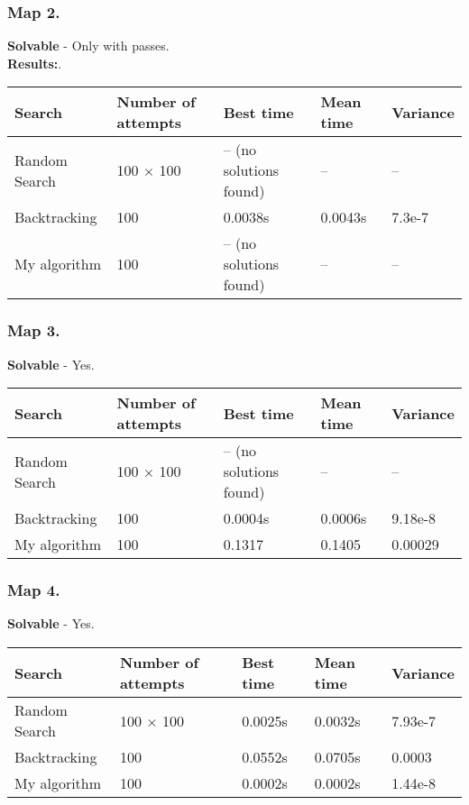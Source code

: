 \documentclass[a4paper,12pt]{article}
\begin{document}
    \subsubsection*{Map 2.}
    
    \textbf{Solvable} - Only with passes.\\
    \textbf{Results:}.

    \begin{center}
        \begin{tabular}{|l|l|l|l|l|}
            \hline
            Search & Number of attempts & Best time & Mean time & Variance\\
            \hline
            Random Search & 100 $\times$ 100 & -- (no solutions found) & -- & --\\
            \hline
            Backtracking & 100 & 0.0038s & 0.0043s & 7.3e-7\\
            \hline
            My algorithm & 100 & -- (no solutions found) & -- &  --\\
            \hline
        \end{tabular}
    \end{center}
    \newpage
    \subsubsection*{Map 3.}
    
    \textbf{Solvable} - Yes.\\
    \begin{center}
        \begin{tabular}{|l|l|l|l|l|}
            \hline
            Search & Number of attempts & Best time & Mean time & Variance\\
            \hline
            Random Search & 100 $\times$ 100 & -- (no solutions found) & -- & --\\
            \hline
            Backtracking & 100 & 0.0004s & 0.0006s & 9.18e-8\\
            \hline
            My algorithm & 100 & 0.1317 & 0.1405 &  0.00029\\
            \hline
        \end{tabular}
    \end{center}
    \newpage
    \subsubsection*{Map 4.}
    
    \textbf{Solvable} - Yes.\\
    \begin{center}
        \begin{tabular}{|l|l|l|l|l|}
            \hline
            Search & Number of attempts & Best time & Mean time & Variance\\
            \hline
            Random Search & 100 $\times$ 100 & 0.0025s & 0.0032s & 7.93e-7\\
            \hline
            Backtracking & 100 & 0.0552s & 0.0705s & 0.0003\\
            \hline
            My algorithm & 100 & 0.0002s & 0.0002s &  1.44e-8\\
            \hline
        \end{tabular}
    \end{center}
    \newpage
\end{document}
